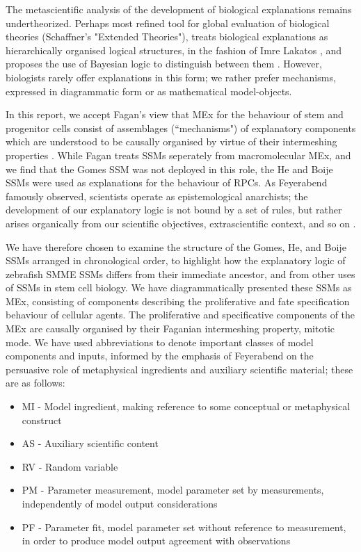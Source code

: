 The metascientific analysis of the development of biological explanations remains undertheorized. Perhaps most refined tool for global evaluation of biological theories (Schaffner's "Extended Theories"), treats biological explanations as hierarchically organised logical structures, in the fashion of Imre Lakatos \cite{Lakatos1976}, and proposes the use of Bayesian logic to distinguish between them \cite{Schaffner1993}. However, biologists rarely offer explanations in this form; we rather prefer mechanisms, expressed in diagrammatic form or as mathematical model-objects.

In this report, we accept Fagan's view that MEx for the behaviour of stem and progenitor cells consist of assemblages (``mechanisms") of explanatory components which are understood to be causally organised by virtue of their intermeshing properties \cite{Fagan2015}. While Fagan treats SSMs seperately from macromolecular MEx, and we find that the Gomes SSM was not deployed in this role, the He and Boije SSMs were used as explanations for the behaviour of RPCs. As Feyerabend famously observed, scientists operate as epistemological anarchists; the development of our explanatory logic is not bound by a set of rules, but rather arises organically from our scientific objectives, extrascientific context, and so on \cite{Feyerabend1993}.
 
We have therefore chosen to examine the structure of the Gomes, He, and Boije SSMs arranged in chronological order, to highlight how the explanatory logic of zebrafish SMME SSMs differs from their immediate ancestor, and from other uses of SSMs in stem cell biology. We have diagrammatically presented these SSMs as MEx, consisting of components describing the proliferative and fate specification behaviour of cellular agents. The proliferative and specificative components of the MEx are causally organised by their Faganian intermeshing property, mitotic mode. We have used abbreviations to denote important classes of model components and inputs, informed by the emphasis of Feyerabend on the persuasive role of metaphysical ingredients and auxiliary scientific material; these are as follows:

 \begin{itemize}
	\item{MI - Model ingredient, making reference to some conceptual or metaphysical construct}
	\item{AS - Auxiliary scientific content}
	\item{RV - Random variable}
	\item{PM - Parameter measurement, model parameter set by measurements, independently of model output considerations}
	\item{PF - Parameter fit, model parameter set without reference to measurement, in order to produce model output agreement with observations}
\end{itemize}

